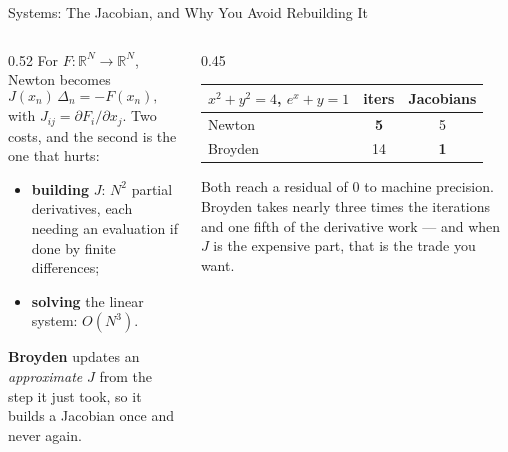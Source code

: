 \begin{frame}{Systems: The Jacobian, and Why You Avoid Rebuilding It}
\begin{columns}[T]
\begin{column}{0.52\textwidth}
\small
For $F:\mathbb{R}^{N}\to\mathbb{R}^{N}$, Newton becomes
\[
  J(x_n)\,\Delta_n=-F(x_n), \qquad x_{n+1}=x_n+\Delta_n,
\]
with $J_{ij}=\partial F_i/\partial x_j$. Two costs, and the second is the one that hurts:
\begin{itemize}\footnotesize
  \item \textbf{building} $J$: $N^2$ partial derivatives, each needing an evaluation if done by finite differences;
  \item \textbf{solving} the linear system: $O(N^{3})$.
\end{itemize}
\medskip
\textbf{Broyden} updates an \emph{approximate} $J$ from the step it just took, so it builds a Jacobian once and never again.
\end{column}
\begin{column}{0.45\textwidth}
\begin{center}\footnotesize
\begin{tabularx}{\linewidth}{@{}>{\raggedright\arraybackslash}X c c@{}}
\toprule
$x^2+y^2=4$, $e^{x}+y=1$ & \textbf{iters} & \textbf{Jacobians} \\
\midrule
Newton & \textbf{5} & 5 \\
Broyden & 14 & \textbf{1} \\
\bottomrule
\end{tabularx}
\end{center}
\vspace{1mm}
\begin{takeawaybox}\footnotesize
Both reach a residual of $0$ to machine precision. Broyden takes nearly three times the iterations and one fifth of the derivative work --- and when $J$ is the expensive part, that is the trade you want.
\end{takeawaybox}
\end{column}
\end{columns}
\vspace{1mm}
\end{frame}

